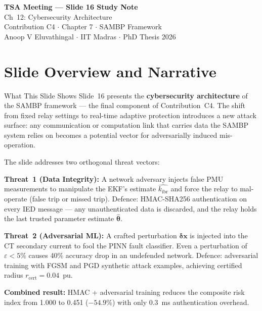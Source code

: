 \documentclass[12pt,a4paper]{article}
\newcommand{\kibr}{k_\mathrm{ibr}}
\begin{document}
\begin{tcolorbox}[colback=iitmnavy,coltext=white,arc=4pt,boxrule=0pt]
\begin{center}
  {\Large\bfseries TSA Meeting --- Slide 16 Study Note}\\[4pt]
  {\large Ch~12: Cybersecurity Architecture}\\[6pt]
  {\normalsize Contribution C4 $\cdot$ Chapter 7 $\cdot$ SAMBP Framework}\\[2pt]
  {\small Anoop V Eluvathingal $\cdot$ IIT Madras $\cdot$ PhD Thesis 2026}
\end{center}
\end{tcolorbox}

\vspace{6pt}

\section{Slide Overview and Narrative}

\begin{keybox}{What This Slide Shows}
Slide~16 presents the \textbf{cybersecurity architecture} of the SAMBP framework — the final component of Contribution~C4. The shift from fixed relay settings to real-time adaptive protection introduces a new attack surface: any communication or computation link that carries data the SAMBP system relies on becomes a potential vector for adversarially induced mis-operation.

The slide addresses two orthogonal threat vectors:

\textbf{Threat~1 (Data Integrity):} A network adversary injects false PMU measurements to manipulate the EKF's estimate $\hat{\kibr}$ and force the relay to mal-operate (false trip or missed trip). Defence: HMAC-SHA256 authentication on every IED message — any unauthenticated data is discarded, and the relay holds the last trusted parameter estimate $\hat{\bm{\theta}}$.

\textbf{Threat~2 (Adversarial ML):} A crafted perturbation $\bm{\delta x}$ is injected into the CT secondary current to fool the PINN fault classifier. Even a perturbation of $\varepsilon < 5\%$ causes 40\% accuracy drop in an undefended network. Defence: adversarial training with FGSM and PGD synthetic attack examples, achieving certified radius $r_\mathrm{cert} = 0.04$~pu.

\textbf{Combined result:} HMAC + adversarial training reduces the composite risk index from 1.000 to 0.451 ($-54.9\%$) with only 0.3~ms authentication overhead.
\end{keybox}
\end{document}
